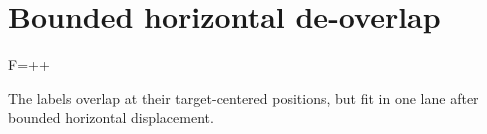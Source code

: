 \documentclass{article}
\begin{document}
\section*{Bounded horizontal de-overlap}
\begin{annotatedequation}
F=++
\end{annotatedequation}
The labels overlap at their target-centered positions, but fit in one lane after bounded horizontal displacement.
\end{document}

